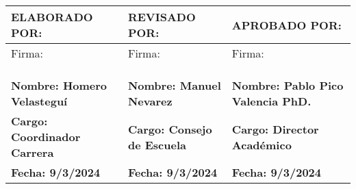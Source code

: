 
\noindent
\begin{tabularx}{\textwidth}{|X|X|X|}
    \hline
    \textbf{ELABORADO POR:} & \textbf{REVISADO POR:} & \textbf{APROBADO POR:} \\ \hline
    Firma: & Firma: & Firma:\\
    &&\\
    &&\\
    &&\\ \hline
    \textbf{Nombre: Homero Velasteguí} & \textbf{Nombre: Manuel Nevarez} & \textbf{Nombre: Pablo Pico Valencia PhD.} \\ \hline
    \textbf{Cargo: Coordinador Carrera} & \textbf{Cargo: Consejo de Escuela} & \textbf{Cargo: Director Académico} \\ \hline
    \textbf{Fecha: 9/3/2024} & \textbf{Fecha: 9/3/2024} & \textbf{Fecha: 9/3/2024} \\ \hline
\end{tabularx}